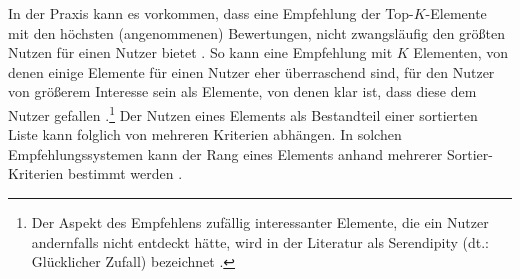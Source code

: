 In der Praxis kann es vorkommen, dass eine Empfehlung der Top-$K$-Elemente mit den höchsten (angenommenen) Bewertungen, nicht zwangsläufig den größten Nutzen für einen Nutzer bietet \cite[S. 896ff.]{adomavicius:article}.
So kann eine Empfehlung mit $K$ Elementen, von denen einige Elemente für einen Nutzer eher überraschend sind, für den Nutzer von größerem Interesse sein als Elemente, von denen klar ist, dass diese dem Nutzer gefallen \cite[S. 43]{herlocker:article}.\footnote{Der Aspekt des Empfehlens zufällig interessanter Elemente, die ein Nutzer andernfalls nicht entdeckt hätte, wird in der Literatur als Serendipity (dt.: Glücklicher Zufall) bezeichnet \cite[S. 43]{herlocker:article}\cite[S. 3]{recommenderSystems:2016}\cite[S. 1099]{mcnee:inproceedings}.}
Der Nutzen eines Elements als Bestandteil einer sortierten Liste kann folglich von mehreren Kriterien abhängen.
In solchen Empfehlungssystemen kann der Rang eines Elements anhand mehrerer Sortier-Kriterien bestimmt werden \cite[S. 405f.]{unternährer:article}.

